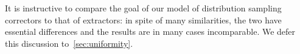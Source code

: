 It is instructive to compare the goal of our model of distribution
sampling correctors to that of extractors: in spite of many similarities, the two have essential differences and the results are in many cases incomparable. We defer this discussion to~\cref{sec:uniformity}.
